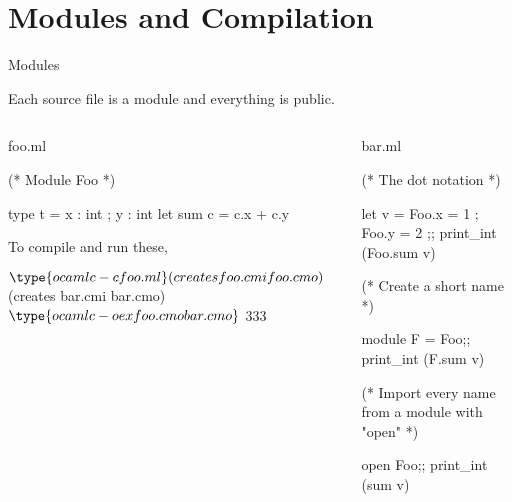 \documentclass{plt}
\begin{document}
\part{Modules and Compilation}
\frame{\partpage}

\begin{frame}[fragile]{Modules}

Each source file is a module and everything is public.

\vspace{1pc}

\begin{columns}
  \begin{column}[t]{0.5\textwidth}
foo.ml
\medskip
\begin{ocaml}
(* Module Foo *)

type t = { x : int ; y : int }
let sum c = c.x + c.y
\end{ocaml}

\vspace{1pc}

To compile and run these,

\medskip

\begin{interactive}
$ \type{ocamlc -c foo.ml}
  (creates foo.cmi foo.cmo)
$ 
  (creates bar.cmi bar.cmo)
$ \type{ocamlc -o ex foo.cmo bar.cmo}
$ 
333
\end{interactive}

  \end{column}
  \begin{column}[t]{0.5\textwidth}
bar.ml
\medskip
\begin{ocaml}
(* The dot notation *)

let v = { Foo.x = 1 ;
          Foo.y = 2 };;
print_int (Foo.sum v)

(* Create a short name *)

module F = Foo;;
print_int (F.sum v)

(* Import every name from
   a module with "open" *)

open Foo;;
print_int (sum v)
\end{ocaml}
  \end{column}
\end{columns}

\end{frame}
\end{document}
